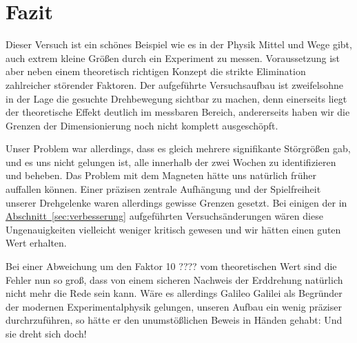 \documentclass[11pt]{scrartcl}
\newcommand{\hypref}[2]{\hyperref[#2]{{#1}~\ref{#2}}}
\begin{document}
\section{Fazit} %
Dieser Versuch ist ein schönes Beispiel wie es in der Physik Mittel und Wege gibt, auch extrem kleine Größen durch ein Experiment zu messen.
Voraussetzung ist aber neben einem theoretisch richtigen Konzept die strikte Elimination zahlreicher störender Faktoren.
Der aufgeführte Versuchsaufbau ist zweifelsohne in der Lage die gesuchte Drehbewegung sichtbar zu machen, denn einerseits liegt der theoretische Effekt deutlich im messbaren Bereich, andererseits haben wir die Grenzen der Dimensionierung noch nicht komplett ausgeschöpft.

Unser Problem war allerdings, dass es gleich mehrere signifikante Störgrößen gab, und es uns nicht gelungen ist, alle innerhalb der zwei Wochen zu identifizieren und beheben.
Das Problem mit dem Magneten hätte uns natürlich früher auffallen können.
Einer präzisen zentrale Aufhängung und der Spielfreiheit unserer Drehgelenke waren allerdings gewisse Grenzen gesetzt.
Bei einigen der in \hypref{Abschnitt}{sec:verbesserung} aufgeführten Versuchsänderungen wären diese Ungenauigkeiten vielleicht weniger kritisch gewesen und wir hätten einen guten Wert erhalten.

Bei einer Abweichung um den Faktor 10 ???? vom theoretischen Wert sind die Fehler nun so groß, dass von einem sicheren Nachweis der Erddrehung natürlich nicht mehr die Rede sein kann.
Wäre es allerdings Galileo Galilei als Begründer der modernen Experimentalphysik gelungen, unseren Aufbau ein wenig präziser durchrzuführen, so hätte er den unumstößlichen Beweis in Händen gehabt:
Und sie dreht sich doch!
\end{document}
